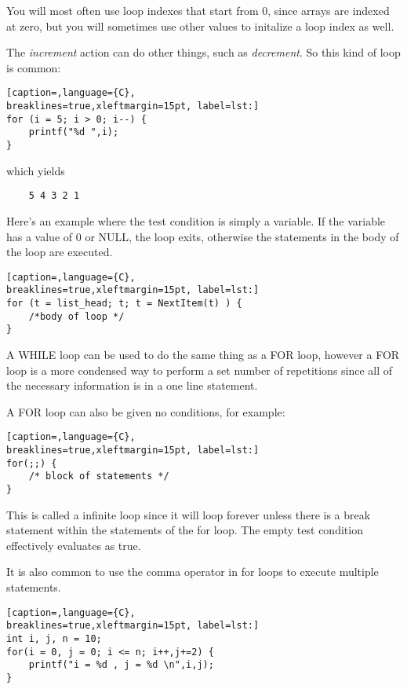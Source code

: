 You will most often use loop indexes that start from 0, since arrays are
indexed at zero, but you will sometimes use other values to initalize a loop
index as well.

The \emph{increment} action can do other things, such as \emph{decrement}. So
this kind of loop is common:

\lstset{basicstyle=\scriptsize, numbers=left, captionpos=b, tabsize=4}
\begin{lstlisting}[caption=,language={C},
breaklines=true,xleftmargin=15pt, label=lst:]
for (i = 5; i > 0; i--) {
	printf("%d ",i);
}
\end{lstlisting}

which yields
\scriptsize
\begin{verbatim}
	5 4 3 2 1 
\end{verbatim}
\normalsize

Here's an example where the test condition is simply a variable. If the
variable has a value of 0 or NULL, the loop exits, otherwise the statements in
the body of the loop are executed.
\lstset{basicstyle=\scriptsize, numbers=left, captionpos=b, tabsize=4}
\begin{lstlisting}[caption=,language={C},
breaklines=true,xleftmargin=15pt, label=lst:]
for (t = list_head; t; t = NextItem(t) ) {
	/*body of loop */
}
\end{lstlisting}

A WHILE loop can be used to do the same thing as a FOR loop, however a FOR loop
is a more condensed way to perform a set number of repetitions since all of the
necessary information is in a one line statement.

A FOR loop can also be given no conditions, for example:

\lstset{basicstyle=\scriptsize, numbers=left, captionpos=b, tabsize=4}
\begin{lstlisting}[caption=,language={C},
breaklines=true,xleftmargin=15pt, label=lst:]
for(;;) {
	/* block of statements */
}
\end{lstlisting}

This is called a infinite loop since it will loop forever unless there is a
break statement within the statements of the for loop. The empty test condition
effectively evaluates as true.

It is also common to use the comma operator in for loops to execute multiple
statements. 
\lstset{basicstyle=\scriptsize, numbers=left, captionpos=b, tabsize=4}
\begin{lstlisting}[caption=,language={C},
breaklines=true,xleftmargin=15pt, label=lst:]
int i, j, n = 10;
for(i = 0, j = 0; i <= n; i++,j+=2) {
	printf("i = %d , j = %d \n",i,j);
}
\end{lstlisting}

